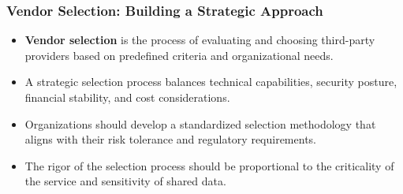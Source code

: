\documentclass{beamer}
\begin{document}
\begin{frame}
    \frametitle{Vendor Selection: Building a Strategic Approach}
    
    \begin{itemize}
        \item \textbf{Vendor selection} is the process of evaluating and choosing third-party providers based on predefined criteria and organizational needs.
        \item A strategic selection process balances technical capabilities, security posture, financial stability, and cost considerations.
        \item Organizations should develop a standardized selection methodology that aligns with their risk tolerance and regulatory requirements.
        \item The rigor of the selection process should be proportional to the criticality of the service and sensitivity of shared data.
    \end{itemize}
    
\end{frame}
\end{document}
